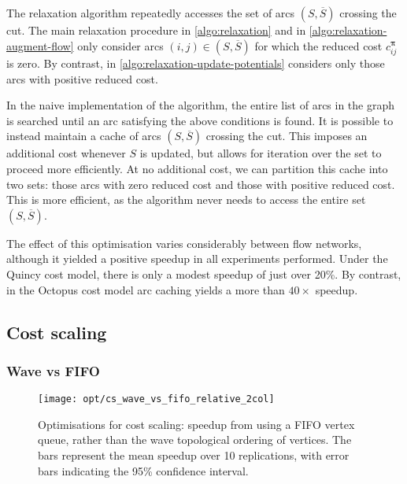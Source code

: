 The relaxation algorithm repeatedly accesses the set of arcs $\left(S,\overline{S}\right)$ crossing the cut. The main relaxation procedure in \cref{algo:relaxation} and  in \cref{algo:relaxation-augment-flow} only consider arcs $(i,j) \in \left(S,\overline{S}\right)$ for which the reduced cost $c_{ij}^{\boldsymbol{\pi}}$ is zero. By contrast,  in \cref{algo:relaxation-update-potentials} considers only those arcs with positive reduced cost.

In the naive implementation of the algorithm, the entire list of arcs in the graph is searched until an arc satisfying the above conditions is found. It is possible to instead maintain a cache of arcs $\left(S,\overline{S}\right)$ crossing the cut. This imposes an additional cost whenever $S$ is updated, but allows for iteration over the set to proceed more efficiently. At no additional cost, we can partition this cache into two sets: those arcs with zero reduced cost and those with positive reduced cost\footnotemark. This is more efficient, as the algorithm never needs to access the entire set $\left(S,\overline{S}\right)$.

The effect of this optimisation varies considerably between flow networks, although it yielded a positive speedup in all experiments performed. Under the Quincy cost model, there is only a modest speedup of just over 20\%. By contrast, in the Octopus cost model arc caching yields a more than $40\times$ speedup\footnotemark.

\subsection{Cost scaling}

\subsubsection{Wave vs FIFO}

\begin{figure}
    \centering
    \texttt{[image: opt/cs\_wave\_vs\_fifo\_relative\_2col]}
    \caption[Optimisations for cost scaling]{Optimisations for cost scaling: speedup from using a FIFO vertex queue, rather than the wave topological ordering of vertices. The bars represent the mean speedup over 10 replications, with error bars indicating the 95\% confidence interval.}
    \label{fig:opt-cs-wave-vs-fifo}
\end{figure}

